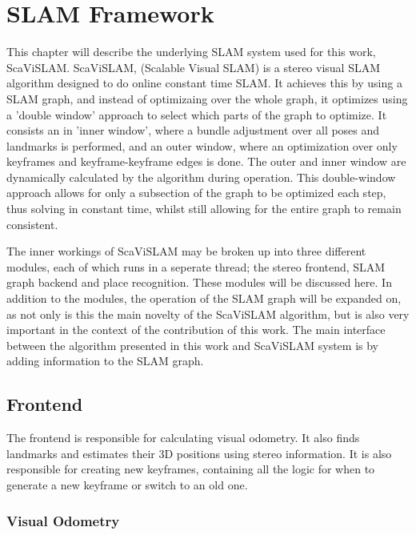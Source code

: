 \chapter{SLAM Framework}
\label{chapter:ScaViSLAM}

This chapter will describe the underlying SLAM system used for this work, ScaViSLAM.  ScaViSLAM,
(Scalable Visual SLAM) is a stereo visual SLAM algorithm designed to do online constant time SLAM. 
It achieves this by using a SLAM graph, and instead of optimizaing over the whole graph,
it optimizes using a 'double window' approach to select which parts of the graph to optimize.  It
consists an in 'inner window', where a bundle adjustment over all poses and landmarks is performed,
and an outer window, where an optimization over only keyframes and keyframe-keyframe edges is done.
 The outer and inner window are dynamically calculated by the algorithm during operation.  This
double-window approach allows for only a subsection of the graph to be optimized each step,
thus solving in constant time, whilst still allowing for the entire graph to remain consistent.

The inner workings of ScaViSLAM may be broken up into three different modules, each of which runs
in a seperate thread; the stereo frontend, SLAM graph backend and place recognition. These
modules will be discussed here. In addition to the modules, the operation of the SLAM graph will be
expanded on, as not only is this the main novelty of the ScaViSLAM algorithm, but is also very
important in the context of the contribution of this work. The main interface between the algorithm
presented in this work and ScaViSLAM system is by adding information to the SLAM graph.

\section{Frontend}
\label{sec:scavislam_frontend}

The frontend is responsible for calculating visual odometry.  It also finds landmarks and estimates
their 3D positions using stereo information.  It is also responsible for creating new keyframes,
containing all the logic for when to generate a new keyframe or switch to an old one. 

\subsection{Visual Odometry}


